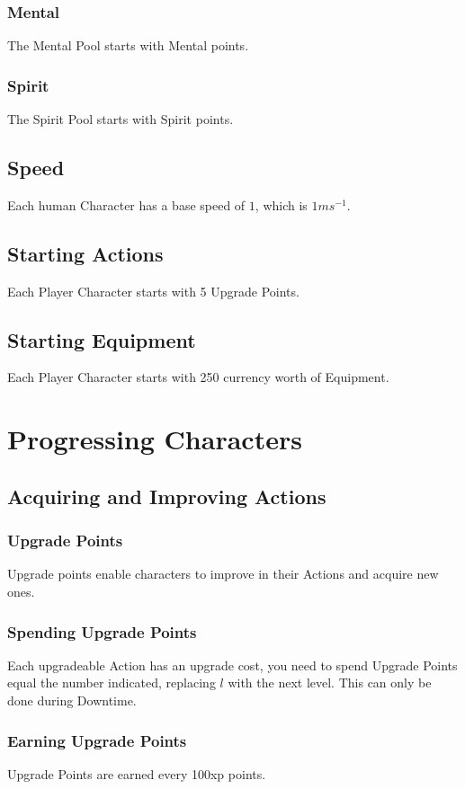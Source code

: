 \documentclass[a4paper,12pt,oneside]{book}
\begin{document}
                \subsubsection{Mental}
                    The Mental Pool starts with Mental points.
                \subsubsection{Spirit}
                    The Spirit Pool starts with Spirit points.
            \subsection{Speed}
                Each human Character has a base speed of $1$, which is $1ms^{-1}$.
            \subsection{Starting Actions}
                Each Player Character starts with 5 Upgrade Points.
            \subsection{Starting Equipment}
                Each Player Character starts with 250 currency worth of Equipment.
        \section{Progressing Characters}
            \subsection{Acquiring and Improving Actions}
                \subsubsection{Upgrade Points}
                    Upgrade points enable characters to improve in their Actions and acquire new ones.
                \subsubsection{Spending Upgrade Points}
                    Each upgradeable Action has an upgrade cost, you need to spend Upgrade Points equal the number indicated, replacing $l$ with the next level. This can only be done during Downtime.
                \subsubsection{Earning Upgrade Points}
                    Upgrade Points are earned every 100xp points.
\end{document}
